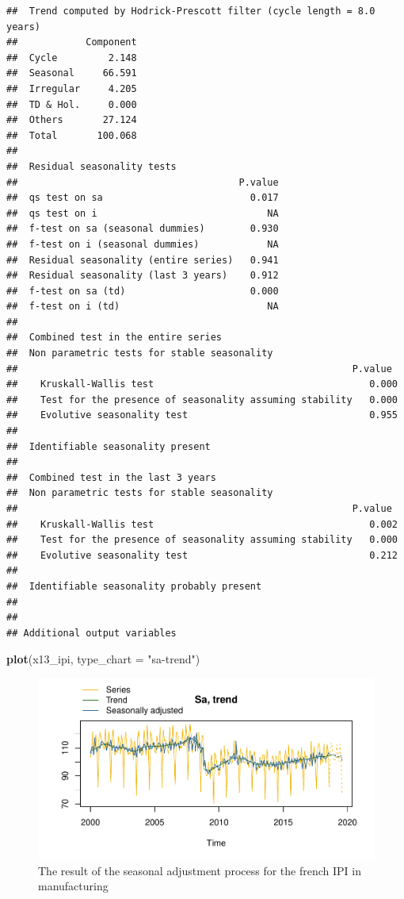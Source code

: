 \documentclass[]{article}
\newenvironment{Shaded}{\begin{snugshade}}{\end{snugshade}}
\newcommand{\KeywordTok}[1]{\textcolor[rgb]{0.13,0.29,0.53}{\textbf{#1}}}
\newcommand{\DataTypeTok}[1]{\textcolor[rgb]{0.13,0.29,0.53}{#1}}
\newcommand{\StringTok}[1]{\textcolor[rgb]{0.31,0.60,0.02}{#1}}
\newcommand{\NormalTok}[1]{#1}
\begin{document}
\begin{verbatim}
##  Trend computed by Hodrick-Prescott filter (cycle length = 8.0 years)
##            Component
##  Cycle         2.148
##  Seasonal     66.591
##  Irregular     4.205
##  TD & Hol.     0.000
##  Others       27.124
##  Total       100.068
## 
##  Residual seasonality tests 
##                                       P.value
##  qs test on sa                          0.017
##  qs test on i                              NA
##  f-test on sa (seasonal dummies)        0.930
##  f-test on i (seasonal dummies)            NA
##  Residual seasonality (entire series)   0.941
##  Residual seasonality (last 3 years)    0.912
##  f-test on sa (td)                      0.000
##  f-test on i (td)                          NA
## 
##  Combined test in the entire series 
##  Non parametric tests for stable seasonality
##                                                           P.value
##    Kruskall-Wallis test                                      0.000
##    Test for the presence of seasonality assuming stability   0.000
##    Evolutive seasonality test                                0.955
##  
##  Identifiable seasonality present
## 
##  Combined test in the last 3 years 
##  Non parametric tests for stable seasonality
##                                                           P.value
##    Kruskall-Wallis test                                      0.002
##    Test for the presence of seasonality assuming stability   0.000
##    Evolutive seasonality test                                0.212
##  
##  Identifiable seasonality probably present
## 
## 
## Additional output variables
\end{verbatim}

\begin{Shaded}
\begin{Highlighting}[]
\KeywordTok{plot}\NormalTok{(x13_ipi, }\DataTypeTok{type_chart =} \StringTok{"sa-trend"}\NormalTok{)}
\end{Highlighting}
\end{Shaded}

\begin{figure}
\centering
\includegraphics{NTTS_files/figure-latex/unnamed-chunk-2-1.pdf}
\caption{\label{fig:sa_ipi}The result of the seasonal adjustment process
for the french IPI in manufacturing}
\end{figure}
\end{document}
